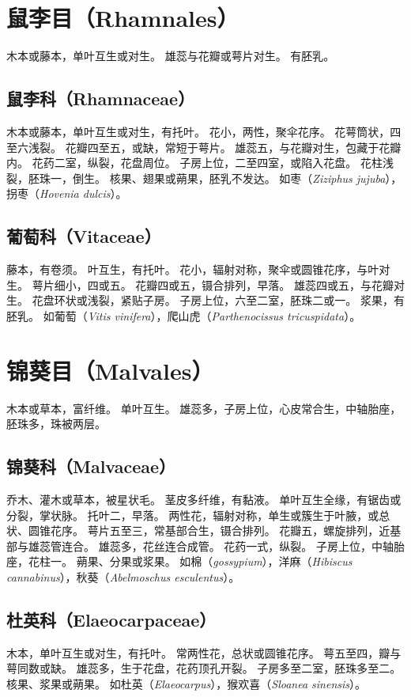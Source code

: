 \documentclass[11pt]{article}
\begin{document}
\begin{sloppypar}
\section{鼠李目（Rhamnales）}
木本或藤本，单叶互生或对生。
雄蕊与花瓣或萼片对生。
有胚乳。

\subsection{鼠李科（Rhamnaceae）}
木本或藤本，单叶互生或对生，有托叶。
花小，两性，聚伞花序。
花萼筒状，四至六浅裂。
花瓣四至五，或缺，常短于萼片。
雄蕊五，与花瓣对生，包藏于花瓣内。
花药二室，纵裂，花盘周位。
子房上位，二至四室，或陷入花盘。
花柱浅裂，胚珠一，倒生。
核果、翅果或蒴果，胚乳不发达。
如枣（\textit{Ziziphus jujuba}），拐枣（\textit{Hovenia dulcis}）。

\subsection{葡萄科（Vitaceae）}
藤本，有卷须。
叶互生，有托叶。
花小，辐射对称，聚伞或圆锥花序，与叶对生。
萼片细小，四或五。
花瓣四或五，镊合排列，早落。
雄蕊四或五，与花瓣对生。
花盘环状或浅裂，紧贴子房。
子房上位，六至二室，胚珠二或一。
浆果，有胚乳。
如葡萄（\textit{Vitis vinifera}），爬山虎（\textit{Parthenocissus tricuspidata}）。

\section{锦葵目（Malvales）}
木本或草本，富纤维。
单叶互生。
雄蕊多，子房上位，心皮常合生，中轴胎座，胚珠多，珠被两层。

\subsection{锦葵科（Malvaceae）}
乔木、灌木或草本，被星状毛。
茎皮多纤维，有黏液。
单叶互生全缘，有锯齿或分裂，掌状脉。
托叶二，早落。
两性花，辐射对称，单生或簇生于叶腋，或总状、圆锥花序。
萼片五至三，常基部合生，镊合排列。
花瓣五，螺旋排列，近基部与雄蕊管连合。
雄蕊多，花丝连合成管。
花药一式，纵裂。
子房上位，中轴胎座，花柱一。
蒴果、分果或浆果。
如棉（\textit{gossypium}），洋麻（\textit{Hibiscus cannabinus}），秋葵（\textit{Abelmoschus esculentus}）。

\subsection{杜英科（Elaeocarpaceae）}
木本，单叶互生或对生，有托叶。
常两性花，总状或圆锥花序。
萼五至四，瓣与萼同数或缺。
雄蕊多，生于花盘，花药顶孔开裂。
子房多至二室，胚珠多至二。
核果、浆果或蒴果。
如杜英（\textit{Elaeocarpus}），猴欢喜（\textit{Sloanea sinensis}）。


\end{sloppypar}
\end{document}

